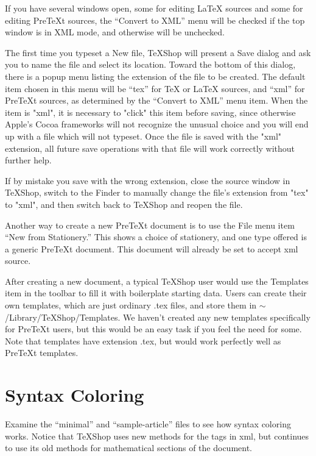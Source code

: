 \documentclass[11pt, oneside]{article}   	%
\begin{document}
If you have several windows open, some for editing LaTeX sources and some for editing PreTeXt sources, the ``Convert to XML'' menu will be checked if the top window is in XML mode, and otherwise will be unchecked.

The first time you typeset a New file, TeXShop will  present a Save dialog and ask you to name the file and select its location. Toward the bottom of this dialog, there is a popup menu listing the extension of the file to be created. The default item chosen in this menu will be ``tex'' for TeX or LaTeX sources, and ``xml'' for PreTeXt sources, as determined by the ``Convert to XML'' menu item.  When the item is "xml",  it is necessary to "click" this item before saving, since otherwise Apple's Cocoa frameworks will not recognize the unusual choice and you will end up with a file which will not typeset.  Once the file is saved  with the "xml" extension, all future save operations with that file will work correctly without further help.

If by mistake you save with the wrong extension, close the source window in TeXShop, switch to the Finder to manually change the file's extension from "tex" to "xml", and then switch back to TeXShop and reopen the file.

Another way to create a new PreTeXt document is to use the File menu item ``New from Stationery.'' This shows a choice of stationery, and one type offered is a generic PreTeXt document. This document will already be set to accept xml source.

After creating a new document, a typical TeXShop user would use the Templates item in the toolbar to fill it with boilerplate starting data. Users can create their own templates, which are just ordinary .tex files, and store them in $\sim$/Library/TeXShop/Templates. We haven't created any new templates specifically for PreTeXt users, but this would be an easy task if you feel the need for some. Note that templates have extension .tex, but would work perfectly well as PreTeXt templates.

\section{Syntax Coloring}

Examine the ``minimal'' and ``sample-article'' files to see how syntax coloring works. Notice that TeXShop uses new methods for the tags in xml, but continues to use its old methods for  mathematical sections of the document.
\end{document}
